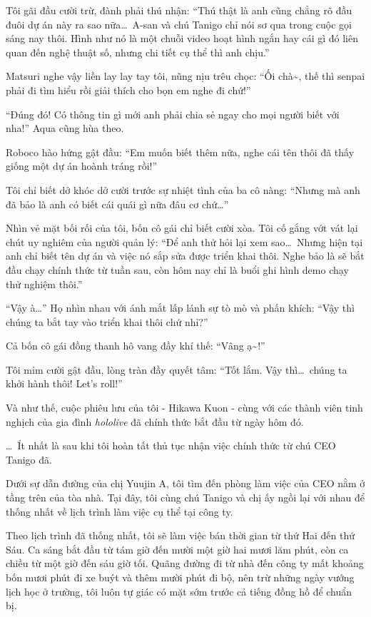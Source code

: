 \documentclass[../main.tex]{subfiles}
\begin{document}
Tôi gãi đầu cười trừ, đành phải thú nhận: ``Thú thật là anh cũng chẳng rõ đầu đuôi dự án này ra sao nữa\dots\ A-san và chú Tanigo chỉ nói sơ qua trong cuộc gọi sáng nay thôi. Hình như nó là một chuỗi video hoạt hình ngắn hay cái gì đó liên quan đến nghệ thuật số, nhưng chi tiết cụ thể thì anh chịu.''

Matsuri nghe vậy liền lay lay tay tôi, nũng nịu trêu chọc: ``Ối chà\~{}, thế thì senpai phải đi tìm hiểu rồi giải thích cho bọn em nghe đi chứ!''

``Đúng đó! Có thông tin gì mới anh phải chia sẻ ngay cho mọi người biết với nha!'' Aqua cũng hùa theo.

Roboco hào hứng gật đầu: ``Em muốn biết thêm nữa, nghe cái tên thôi đã thấy giống một dự án hoành tráng rồi!''

Tôi chỉ biết dở khóc dở cười trước sự nhiệt tình của ba cô nàng: ``Nhưng mà anh đã bảo là anh có biết cái quái gì nữa đâu cơ chứ\dots''

Nhìn vẻ mặt bối rối của tôi, bốn cô gái chỉ biết cười xòa. Tôi cố gắng vớt vát lại chút uy nghiêm của người quản lý: ``Để anh thử hỏi lại xem sao\dots\ Nhưng hiện tại anh chỉ biết tên dự án và việc nó sắp sửa được triển khai thôi. Nghe bảo là sẽ bắt đầu chạy chính thức từ tuần sau, còn hôm nay chỉ là buổi ghi hình demo chạy thử nghiệm thôi.''

``Vậy à\dots'' Họ nhìn nhau với ánh mắt lấp lánh sự tò mò và phấn khích: ``Vậy thì chúng ta bắt tay vào triển khai thôi chứ nhỉ?''

Cả bốn cô gái đồng thanh hô vang đầy khí thế: ``Vâng ạ\~{}!''

Tôi mỉm cười gật đầu, lòng tràn đầy quyết tâm: ``Tốt lắm. Vậy thì\dots\ chúng ta khởi hành thôi! Let's roll!''

Và như thế, cuộc phiêu lưu của tôi - Hikawa Kuon - cùng với các thành viên tinh nghịch của gia đình \textit{hololive} đã chính thức bắt đầu từ ngày hôm đó.

\dots\ Ít nhất là sau khi tôi hoàn tất thủ tục nhận việc chính thức từ chú CEO Tanigo đã.

\ct

Dưới sự dẫn đường của chị Yuujin A, tôi tìm đến phòng làm việc của CEO nằm ở tầng trên của tòa nhà. Tại đây, tôi cùng chú Tanigo và chị ấy ngồi lại với nhau để thống nhất về lịch trình làm việc cụ thể tại công ty.

Theo lịch trình đã thống nhất, tôi sẽ làm việc bán thời gian từ thứ Hai đến thứ Sáu. Ca sáng bắt đầu từ tám giờ đến mười một giờ hai mươi lăm phút, còn ca chiều từ một giờ đến sáu giờ tối. Quãng đường đi từ nhà đến công ty mất khoảng bốn mươi phút đi xe buýt và thêm mười phút đi bộ, nên trừ những ngày vướng lịch học ở trường, tôi luôn tự giác có mặt sớm trước cả tiếng đồng hồ để chuẩn bị.
\end{document}
